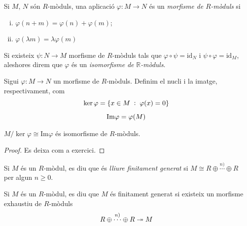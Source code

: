 \documentclass[../main.tex]{subfiles}
\begin{document}
\begin{defi}
Si $M$, $N$ són $R$-mòduls, una aplicació $\varphi:M\rightarrow N$ és un \textit{morfisme de $R$-mòduls} si 
\begin{enumerate}[(i)]
    \item $\varphi(n+m) = \varphi(n)+\varphi(m)$;
    \item $\varphi(\lambda m) = \lambda\varphi(m)$
\end{enumerate}
Si existeix $\psi:N\rightarrow M$ morfisme de $R$-mòduls tals que $\varphi\circ\psi = \mathrm{id}_N$ i $\psi\circ\varphi = \mathrm{id}_M$, aleshores direm que $\varphi$ és un \textit{isomorfisme de $\mathbb{R}$-mòduls}.
\end{defi}


\begin{defi}
Sigui $\varphi:M\rightarrow N$ un morfisme de $R$-mòduls. Definim el nucli i la imatge, respectivament, com
\begin{equation}
    \notag
    \ker\varphi = \{x\in M\;:\;\varphi(x) = 0\}
\end{equation}
\begin{equation}
    \notag
    \mathrm{Im}\varphi = \varphi(M)
\end{equation}
\end{defi}


\begin{ter}
 $M/\ker\varphi\cong \mathrm{Im}\varphi$ és isomorfisme de $R$-mòduls.
\end{ter}
\begin{proof}
Es deixa com a exercici.
\end{proof}

\begin{defi}
Si $M$ és un $R$-mòdul, es diu que és \textit{lliure finitament generat} si $M\cong R\oplus\overset{n)}{\cdots}\oplus R$ per algun $n\geq 0$.
\end{defi}


\begin{defi}
Si $M$ és un $R$-mòdul, es diu que $M$ és finitament generat si existeix un morfisme exhaustiu de $R$-mòduls
\begin{equation}
    \notag
    R\oplus\overset{n)}{\cdots}\oplus R\twoheadrightarrow M
\end{equation}
\end{defi}
\end{document}

